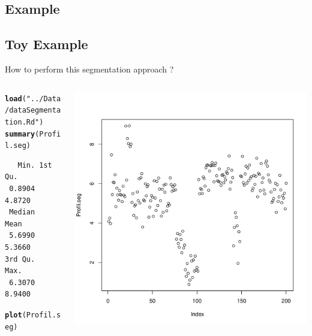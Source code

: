 \documentclass{beamer}\usepackage[]{graphicx}\usepackage[]{color}
\makeatletter
\newcommand{\hlstr}[1]{\textcolor[rgb]{0.192,0.494,0.8}{#1}}%
\newcommand{\hlstd}[1]{\textcolor[rgb]{0.345,0.345,0.345}{#1}}%
\newcommand{\hlkwd}[1]{\textcolor[rgb]{0.737,0.353,0.396}{\textbf{#1}}}%
\newenvironment{kframe}{%
 \def\at@end@of@kframe{}%
 \ifinner\ifhmode%
  \def\at@end@of@kframe{\end{minipage}}%
  \begin{minipage}{\columnwidth}%
 \fi\fi%
 \def\FrameCommand##1{\hskip\@totalleftmargin \hskip-\fboxsep
 \colorbox{shadecolor}{##1}\hskip-\fboxsep
     \hskip-\linewidth \hskip-\@totalleftmargin \hskip\columnwidth}%
 \MakeFramed {\advance\hsize-\width
   \@totalleftmargin\z@ \linewidth\hsize
   \@setminipage}}%
 {\par\unskip\endMakeFramed%
 \at@end@of@kframe}
\newenvironment{knitrout}{}{} %
\makeatother
\begin{document}
\subsection{Example}
\subsection*{ Toy Example}
   \begin{frame}[fragile]{How to perform this segmentation approach ?}

 
\begin{columns}
\begin{column}{0.4\textwidth}
\begin{knitrout}\tiny
{}\color{fgcolor}\begin{kframe}
\begin{alltt}
\hlkwd{load}\hlstd{(}\hlstr{"../Data/dataSegmentation.Rd"}\hlstd{)}
\hlkwd{summary}\hlstd{(Profil.seg)}
\end{alltt}
\begin{verbatim}
   Min. 1st Qu. 
 0.8904  4.8720 
 Median    Mean 
 5.6990  5.3660 
3rd Qu.    Max. 
 6.3070  8.9400 
\end{verbatim}
\begin{alltt}
\hlkwd{plot}\hlstd{(Profil.seg)}
\end{alltt}
\end{kframe}
\end{knitrout}
\end{column}
\begin{column}{0.5\textwidth}
\includegraphics[scale=0.35]{segCode2-1.pdf}
\end{column}
\end{columns}
\end{frame}
\end{document}
